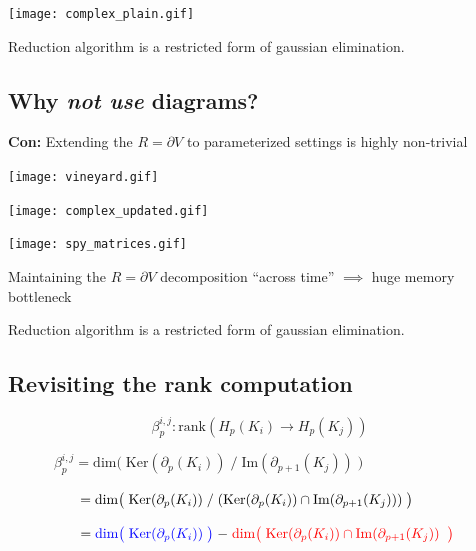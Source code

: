 \documentclass[
  letterpaper,
  DIV=11,
  numbers=noendperiod,
  oneside]{scrartcl}
\begin{document}
\texttt{[image: complex\_plain.gif]}

Reduction algorithm is a restricted form of gaussian elimination.

\hypertarget{why-not-use-diagrams-1}{%
\subsection{\texorpdfstring{Why \emph{not use}
diagrams?}{Why not use diagrams?}}\label{why-not-use-diagrams-1}}

\textbf{Con:} Extending the \(R = \partial V\) to parameterized settings
is highly non-trivial

\texttt{[image: vineyard.gif]}

\texttt{[image: complex\_updated.gif]}

\texttt{[image: spy\_matrices.gif]}

Maintaining the \(R = \partial V\) decomposition ``across time''
\(\implies\) huge memory bottleneck


Reduction algorithm is a restricted form of gaussian elimination.

\hypertarget{revisiting-the-rank-computation}{%
\subsection{Revisiting the rank
computation}\label{revisiting-the-rank-computation}}

\[ \beta_p^{i,j} : \mathrm{rank}(H_p(K_i) \to H_p(K_j))\]

\(\;\quad\quad\quad\beta_p^{i,j} = \mathrm{dim} \big( \;\mathrm{Ker}(\partial_p(K_i))\; / \;\mathrm{Im}(\partial_{p+1}(K_j)) \; \big )\)

\(\;\quad\quad\quad\hphantom{\beta_p^{i,j} }= \mathrm{dim}\big(\; \mathrm{Ker}(\partial_p(K_i)) \; / \; (\mathrm{Ker}(\partial_p(K_i)) \cap \mathrm{Im}(\partial_{p+1}(K_j))) \; \big )\)

\(\;\quad\quad\quad\hphantom{\beta_p^{i,j}}=\color{blue}{\mathrm{dim}\big(\;\mathrm{Ker}(\partial_p(K_i)) \; \big)} \; \color{black}{-} \; \color{red}{\mathrm{dim}\big( \; \mathrm{Ker}(\partial_p(K_i)) \cap \mathrm{Im}(\partial_{p+1}(K_j))\;\; \big)}\)
\end{document}
